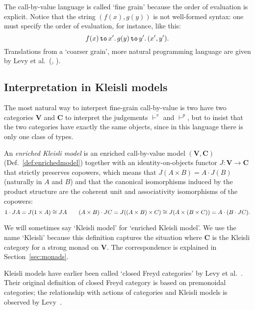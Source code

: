 \documentclass{LMCS}
\newcommand{\vjname}{{\vdash^{v}}}
\newcommand{\pjname}{{\vdash^p}}
\newcommand{\slet}[3]{#2 \, \codefont{to} \, #1 \ld #3}
\newcommand{\codefont}[1]{\mathtt{#1}}
\newcommand{\ld}{\mathpunct{.}}
\newcommand{\VCat}{\fixedcatfont{V}} \newcommand{\CCat}{\fixedcatfont{C}} \newcommand{\DCat}{\fixedcatfont{D}}
\newcommand{\ltensor}[2]{#1 \cdot #2}
\newcommand{\fixedcatfont}{\mathbf}
\begin{document}
The call-by-value language is called `fine grain' because the order of 
evaluation is explicit. Notice that the string
$(f(x),g(y))$ is not well-formed syntax:
one must specify the order of evaluation,
for instance, like this:
\[
\slet{x'} {f(x)}{\slet {y'}{g(y)}{(x',y')}}\text.
\]
Translations from a `coarser grain', more natural programming language
are given by Levy et al.~(\cite[\S 3]{Levy:03}, \cite[\S A.3.3]{Levy:book}).

\subsection{Interpretation in Kleisli models}
\label{sec:interpkleilsi}
The most natural way to interpret fine-grain call-by-value is 
two have two categories $\VCat$ and $\CCat$ to interpret
the judgements $\vjname$ and $\pjname$,
but to insist that the two categories have exactly 
the same objects, since in this language there is only one 
class of types.
\begin{defi}
\label{def:monadmodel}
An \emph{enriched Kleisli model}
is an enriched call-by-value model $(\VCat,\CCat)$ (Def.~\ref{def:enrichedmodel})
together with an 
identity-on-objects functor $J:\VCat\to\CCat$ that strictly
preserves copowers, which means that
$J(A\times B)=\ltensor A J(B)$ (naturally in $A$ and $B$)
and 
that the canonical isomorphisms induced by the product structure
are the coherent unit and associativity isomorphisms of the copowers:
\[
\ltensor1 JA =J(1\times A)\cong JA
\qquad
\ltensor{(A\times B)} JC = J((A\times B)\times C)\cong J(A\times (B\times C))
=
\ltensor A {(\ltensor B {JC})}\text.\]
\end{defi}
We will sometimes say `Kleisli model'
for `enriched Kleisli model'.
We use the name `Kleisli' because this definition
captures the situation where
$\CCat$ is the Kleisli category for a strong monad on $\VCat$.
The correspondence is explained in
Section~\ref{sec:monads}.

Kleisli models have earlier been called
`closed Freyd categories' by Levy et al.~\cite{Levy:03}.
Their original definition of closed Freyd category is based
on premonoidal categories;
the relationship with actions of categories 
and Kleisli models is observed by Levy~\cite[B.10]{Levy:book}.
\end{document}
